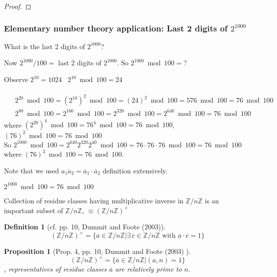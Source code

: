 \documentclass[10pt]{amsart}
\newtheorem{proposition}{Proposition}
\newtheorem{definition}{Definition}
\begin{document}
\begin{multicols*}{2}
\begin{proof}
\end{proof}

\subsubsection{Elementary number theory application: Last 2 digits of $2^{1000}$}

What is the last 2 digits of $2^{1000}$?

Now $2^{1000} / 100 =$ last 2 digits of $2^{1000}$. So $2^{1000} \bmod{100} = $?

Observe $2^{10} = 1024$ \qquad \, $2^{10} \bmod{100} = 24$

\[
\begin{gathered}
\begin{aligned}
& 2^{20} \bmod{100} = (2^{10})^2 \bmod{100} = (24)^2 \bmod{100} = 576 \bmod{100} = 76 \bmod{100} \\
& 2^{80} \bmod{100} = 2^{160} \bmod{100} = 2^{320} \bmod{100} = 2^{640} \bmod{100} = 76 \bmod{100}
\end{aligned}
\end{gathered}
\]
where $(2^{20})^4 \bmod{100} = 76^4 \bmod{100} = 76 \bmod{100}$, \\
$(76)^{2} \bmod{100} = 76 \bmod{100}$ \\

So $2^{1000} \bmod{100} = 2^{640} 2^{320} 2^{40} \bmod{100} = 76 \cdot 76 \cdot 76 \bmod{100} = 76 \bmod{100}$ where $(76)^3 \bmod{100} = 76 \bmod{100}$. 

Note that we used $\overline{a_1a_2} = \overline{a}_1 \cdot \overline{a}_2$ definition extensively.

$2^{1000} \bmod{100} = 76 \bmod{100}$

Collection of residue classes having multiplicative inverse in $\mathbb{Z} / n\mathbb{Z}$ is an important subset of $\mathbb{Z} / n\mathbb{Z}$, $\equiv (\mathbb{Z} / n\mathbb{Z})^{\times}$

\begin{definition}[cf. pp. 10, Dummit and Foote (2003)\cite{DuFo2003}]
\begin{equation}
(\mathbb{Z} / n\mathbb{Z})^{\times} = \lbrace \overline{a} \in \mathbb{Z} / n \mathbb{Z} | \exists \, \overline{c} \in \mathbb{Z} / n \mathbb{Z} \text{ with } \overline{a} \cdot \overline{c} = 1 \rbrace 
\end{equation}
\end{definition}

\begin{proposition}[Prop. 4, pp. 10, Dummit and Foote (2003) \cite{DuFo2003}]
\[
(\mathbb{Z} / n\mathbb{Z})^{\times} = \lbrace \overline{a} \in \mathbb{Z} / n \mathbb{Z} | (a,n) = 1 \rbrace
\], representatives of residue classes $\overline{a}$ are relatively prime to $n$.


\end{proposition}
\end{multicols*}
\end{document}
